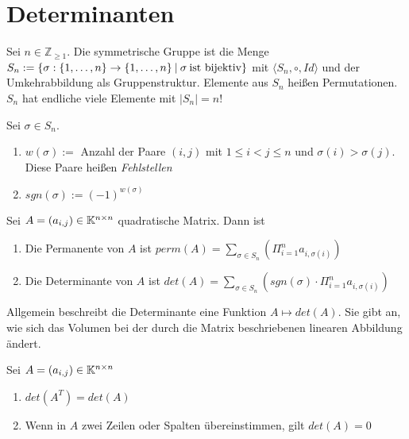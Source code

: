 \section{Determinanten} 

\begin{definition}
	Sei $n \in \mathbb{Z}_{\geq 1}$. Die symmetrische Gruppe ist die Menge $S_n := \{ \sigma : \{ 1, \dots, n \} \rightarrow \{1, \dots, n\} \medspace | \medspace \sigma \medspace \textnormal{ist bijektiv}  \}$ mit $\langle S_n, \circ, Id \rangle$ und der Umkehrabbildung als Gruppenstruktur. Elemente aus $S_n$ heißen Permutationen. $S_n$ hat endliche viele Elemente mit $|S_n| = n!$
\end{definition}

\begin{definition}
	Sei $\sigma \in S_n$.
	\begin{enumerate}[noitemsep]
		\item $w(\sigma) := $ Anzahl der Paare $(i,j)$ mit $1 \leq i < j \leq n$ und $\sigma(i) > \sigma(j)$. Diese Paare heißen \emph{Fehlstellen}
		\item $sgn(\sigma) := (-1)^{w(\sigma)}$
	\end{enumerate}
\end{definition}

\begin{definition}
	Sei $A = (a_{i,j}) \in \mathbb{K}^{n \times n}$ quadratische Matrix. Dann ist
	\begin{enumerate}[noitemsep]
		\item Die Permanente von $A$ ist $perm(A) = \sum_{\sigma \in S_n}(\Pi_{i=1}^n a_ {i, \sigma(i)})$
		\item Die Determinante von $A$ ist $det(A) = \sum_{\sigma \in S_n}(sgn(\sigma) \cdot \Pi_{i=1}^n a_ {i, \sigma(i)})$		
	\end{enumerate}
	Allgemein beschreibt die Determinante eine Funktion $A \mapsto det(A)$. Sie gibt an, wie sich das Volumen bei der durch die Matrix beschriebenen linearen Abbildung ändert.
\end{definition}

\begin{satz}
	Sei $A = (a_{i,j}) \in \mathbb{K}^{n \times n}$
	\begin{enumerate}[noitemsep]
		\item $det(A^T) = det(A)$
		\item Wenn in $A$ zwei Zeilen oder Spalten übereinstimmen, gilt $det(A) = 0$
	\end{enumerate}
\end{satz}

